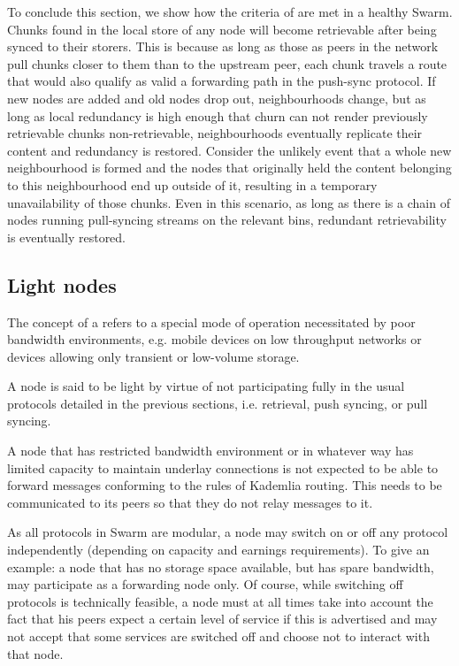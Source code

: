 To conclude this section, we show how the criteria of  are met in a healthy Swarm. Chunks found in the local store of any node will become retrievable after being synced to their storers. This is because as long as those as peers in the network pull chunks closer to them than to the upstream peer, each chunk travels a route that would also qualify as valid a forwarding path in the push-sync protocol. If new nodes are added and old nodes drop out, neighbourhoods change, but as long as local redundancy is high enough that churn can not render previously retrievable chunks non-retrievable, neighbourhoods eventually replicate their content and redundancy is restored. Consider the unlikely event that a whole new neighbourhood is formed and the nodes that originally held the content belonging to this neighbourhood end up outside of it, resulting in a temporary unavailability of those chunks. Even in this scenario, as long as there is a chain of nodes running pull-syncing streams on the relevant bins, redundant retrievability is eventually restored.

\subsection{Light nodes\statusgreen}
\label{sec:light}

The concept of a  refers to a special mode of operation necessitated by poor bandwidth environments, e.g. mobile devices on low throughput networks or devices allowing only transient or low-volume storage.

A node is said to be light by virtue of not participating fully in the usual protocols detailed in the previous sections, i.e. retrieval, push syncing, or pull syncing. 

A node that has restricted bandwidth environment or in whatever way has limited capacity to maintain underlay connections is not expected to be able to forward messages conforming to the rules of Kademlia routing. This needs to be communicated to its peers so that they do not relay messages to it. 

As all protocols in Swarm are modular, a node may switch on or off any protocol independently (depending on capacity and earnings requirements). To give an example: a node that has no storage space available, but has spare bandwidth, may participate as a forwarding node only. Of course, while switching off protocols is technically feasible, a node must at all times take into account the fact that his peers expect a certain level of service if this is advertised and may not accept that some services are switched off and choose not to interact with that node. 

